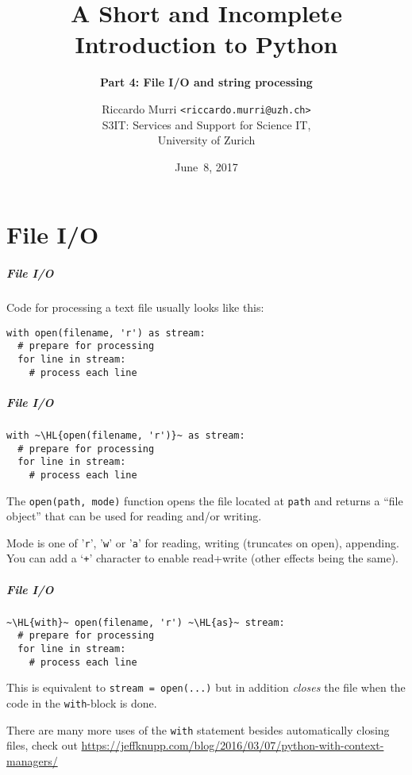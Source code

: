 \documentclass[english,serif,mathserif,xcolor=pdftex,dvipsnames,table]{beamer}
\title[4. Files and strings]{%
  A Short and Incomplete Introduction to Python
}
\subtitle{\bfseries Part 4: File I/O and string processing}
\author[R.~Murri]{%
  Riccardo Murri \texttt{<riccardo.murri@uzh.ch>}
  \\
  S3IT: Services and Support for Science IT,
  \\
  University of Zurich
}
\date{June~8, 2017}
\begin{document}
\maketitle


\part{File I/O}

\begin{frame}[fragile]
  \frametitle{File I/O}

  Code for processing a text file usually looks like this:
\begin{lstlisting}
with open(filename, 'r') as stream:
  # prepare for processing
  for line in stream:
    # process each line
\end{lstlisting}
\end{frame}


\begin{frame}[fragile]
  \frametitle{File I/O}

\begin{lstlisting}
with ~\HL{open(filename, 'r')}~ as stream:
  # prepare for processing
  for line in stream:
    # process each line
\end{lstlisting}

  \+ The \lstinline|open(path, mode)| function opens the file located at
  \texttt{path} and returns a ``file object'' that can be used for reading
  and/or writing.

  \+ Mode is one of '\texttt{r}', '\texttt{w}' or '\texttt{a}' for reading,
  writing (truncates on open), appending. You can add a `\texttt{+}' character
  to enable read+write (other effects being the same).
\end{frame}


\begin{frame}[fragile]
  \frametitle{File I/O}

\begin{lstlisting}
~\HL{with}~ open(filename, 'r') ~\HL{as}~ stream:
  # prepare for processing
  for line in stream:
    # process each line
\end{lstlisting}

  \+
  This is equivalent to \lstinline|stream = open(...)| but in addition
  \emph{closes} the file when the code in the \texttt{with}-block is done.

  \+
  There are many more uses of the \texttt{with} statement besides automatically
  closing files, check out \url{https://jeffknupp.com/blog/2016/03/07/python-with-context-managers/}
\end{frame}
\end{document}
